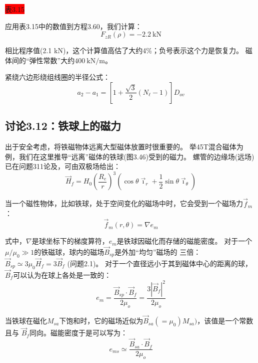 \colorbox{red}{表3.15}

应用表3.15中的数值到方程3.60，我们计算：
$$F_{zR}(\rho)=-2.2\ \mathrm{kN}$$

相比程序值(2.1 kN)，这个计算值高估了大约4\%；负号表示这个力是恢复力。
磁体间的“弹性常数”大约$400\ \mathrm{kN/m}$。

紧绕六边形绕组线圈的半径公式：
\begin{equation}
a_{2}-a_{1}=[1+\frac{\sqrt{3}}{2}(N_{\ell}-1)]D_{ov}
\end{equation}


\subsection{讨论3.12：铁球上的磁力}
出于安全考虑，将铁磁物体远离大型磁体放置时很重要的。
举45T混合磁体为例，我们在这里推导“远离”磁体的铁球(图3.46)受到的磁力。
螺管的边缘场(远场)已在问题311论及，可由双极场给出：
\begin{equation*}%
\vec{H}_{f}=H_{0}(\frac{R_{e}}{r})^{3}(\cos\theta\vec{\imath}_{r}+\frac{1}{2}\sin\theta\vec{\imath}_{\theta}) \tag{3.163}
\end{equation*}

当一个磁性物体，比如铁球，处于空间变化的磁场中时，它会受到一个磁场力$\vec{f}_m$：
\begin{equation}
\vec{f}_{m}(r,\theta)=\nabla e_{m}%
\end{equation}

式中，$\nabla$是球坐标下的梯度算符，$e_m$是铁球因磁化而存储的磁能密度。
对于一个$\mu/\mu_0\gg 1$的铁磁球，球内的磁场$\vec{B}_{sp}$是外加“均匀”磁场的
三倍：$\vec{B}_{sp}\simeq 3\mu_0 \vec{H}_f= 3\vec{B}_f$ (问题2.1)。
对于一个直径远小于其到磁体中心的距离的球，$\vec{B}_f$可以认为在球上各处是一致的：
\begin{equation}
e_{m}=\frac{\vec{B}_{sp}\cdot\vec{B}_{f}}{2\mu_{o}}=\frac{3|\vec{B}_{f}|^{2}}{2\mu_{o}}%
\end{equation}

当铁球在磁化$M_{sa}$下饱和时，它的磁场近似为$\vec{B}_{sa} (= \mu_{0}) M_{sa})$，该值是一个常数且与
$\vec{B}_f$同向。磁能密度于是可以写为：
\begin{equation}
e_{ms}\simeq\frac{\vec{B}_{sa}\cdot\vec{B}_{f}}{2\mu_{o}}%
\end{equation}

